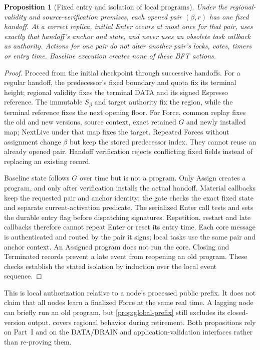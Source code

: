 \documentclass[11pt,a4paper]{article}
\newtheorem{proposition}[proposition]{Proposition}
\begin{document}
\begin{proposition}[Fixed entry and isolation of local programs]
\label{prop:program-isolation}
Under the regional-validity and source-verification premises, each
opened pair $(\beta,r)$ has one fixed handoff. At a correct replica,
initial Enter occurs at most once for that pair, uses exactly that
handoff's anchor and state, and never uses an obsolete task callback
as authority. Actions for one pair do not alter another pair's locks,
votes, timers or entry time. Baseline execution creates none of
these BFT actions.
\end{proposition}
\begin{proof}
Proceed from the initial checkpoint through successive handoffs.
For a regular handoff, the predecessor's fixed boundary and quota fix
its terminal height; regional validity fixes the terminal DATA and its
signed Espresso reference. The immutable $S_\beta$ and target authority
fix the region, while the terminal reference fixes the next opening
floor. For Force, common replay fixes the old and new versions, source
context, exact retained $G$ and newly installed map; NextLive under that
map fixes the target. Repeated Forces without assignment
change $\beta$ but keep the stored predecessor index. They cannot
reuse an already opened pair. Handoff verification rejects conflicting
fixed fields instead of replacing an existing record.

Baseline state follows $G$ over time but is not a program. Only Assign
creates a program, and only after verification installs the actual
handoff.
Material callbacks keep the requested pair and anchor identity;
the gate checks the exact fixed state and separate current-activation predicate.
The serialized Enter call tests and sets the durable entry flag
before dispatching signatures. Repetition, restart and late callbacks
therefore cannot repeat Enter or reset its entry time. Each core
message is authenticated and routed by the pair it signs; local tasks
use the same pair and anchor context. An Assigned program does not run
the core.
Closing and Terminated records prevent a late event from reopening an
old program. These checks establish the stated isolation by induction
over the local event sequence.
\end{proof}

This is local authorization relative to a node's processed public
prefix. It does not claim that all nodes learn a finalized Force at the
same real time. A lagging node can briefly run an old program, but
\cref{prop:global-prefix} still excludes its closed-version output.
 covers regional behavior during
retirement. Both propositions rely on Part~I and on the DATA/DRAIN and
application-validation interfaces rather than re-proving them.
\end{document}
